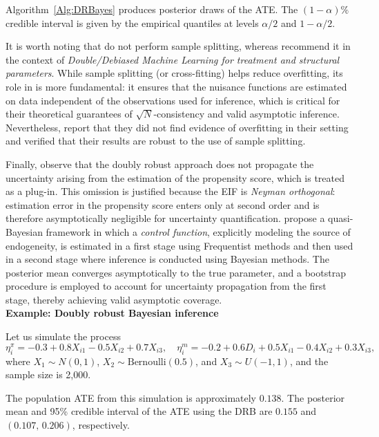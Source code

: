 Algorithm~\ref{Alg:DRBayes} produces posterior draws of the ATE. The $(1-\alpha)\%$ credible interval is given by the empirical quantiles at levels $\alpha/2$ and $1-\alpha/2$. 

It is worth noting that \cite{breunig2025double} do not perform sample splitting, whereas \cite{chernozhukov2018double} recommend it in the context of \textit{Double/Debiased Machine Learning for treatment and structural parameters}. While sample splitting (or cross-fitting) helps reduce overfitting, its role in \cite{chernozhukov2018double} is more fundamental: it ensures that the nuisance functions are estimated on data independent of the observations used for inference, which is critical for their theoretical guarantees of $\sqrt{N}$-consistency and valid asymptotic inference. Nevertheless, \cite{breunig2025double} report that they did not find evidence of overfitting in their setting and verified that their results are robust to the use of sample splitting.

Finally, observe that the doubly robust approach does not propagate the uncertainty arising from the estimation of the propensity score, which is treated as a plug-in. This omission is justified because the EIF is \textit{Neyman orthogonal}: estimation error in the propensity score enters only at second order and is therefore asymptotically negligible for uncertainty quantification. \cite{LiuYu2024QuasiBayesianCF} propose a quasi-Bayesian framework in which a \textit{control function}, explicitly modeling the source of endogeneity, is estimated in a first stage using Frequentist methods and then used in a second stage where inference is conducted using Bayesian methods. The posterior mean converges asymptotically to the true parameter, and a bootstrap procedure is employed to account for uncertainty propagation from the first stage, thereby achieving valid asymptotic coverage.\\

\textbf{Example: Doubly robust Bayesian inference}

Let us simulate the process 
\[
\eta^{\pi}_i = -0.3 + 0.8X_{i1} - 0.5X_{i2} + 0.7X_{i3}, 
\quad 
\eta^{m}_i = -0.2 + 0.6D_i + 0.5X_{i1} - 0.4X_{i2} + 0.3X_{i3},
\]
where $X_{1}\sim N(0,1)$, $X_{2}\sim \mathrm{Bernoulli}(0.5)$, and $X_{3}\sim U(-1,1)$, and the sample size is 2,000.
 
The population ATE from this simulation is approximately $0.138$. The posterior mean and 95\% credible interval of the ATE using the DRB are $0.155$ and $(0.107,\,0.206)$, respectively. 

